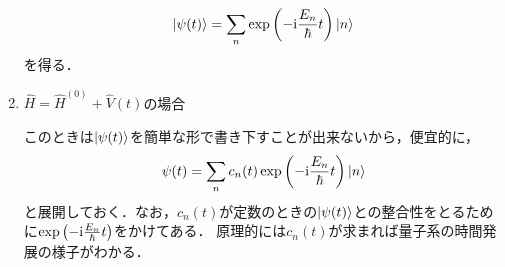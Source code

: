 \documentclass{report}
\begin{document}
\begin{enumerate}
\begin{align}
        \ket{\psi(t)} = \sum_{n}\exp\qty(-\mathrm{i}\frac{E_n}{\hbar}t)\ket{n}
      \end{align}
      を得る．
    \item $\hat{H} = \hat{H}^{(0)} + \hat{V}(t)$の場合\par
      このときは$\ket{\psi(t)}$を簡単な形で書き下すことが出来ないから，便宜的に，
      \begin{align}
        \psi(t) = \sum_{n}c_n(t)\exp\qty(-\mathrm{i}\frac{E_n}{\hbar}t)\ket{n}
      \end{align}
      と展開しておく．なお，$c_n(t)$が定数のときの$\ket{\psi(t)}$との整合性をとるために$\exp\qty(-\mathrm{i}\frac{E_n}{\hbar}t)$をかけてある．
      原理的には$c_n(t)$が求まれば量子系の時間発展の様子がわかる．%
  \end{enumerate}
\end{document}

